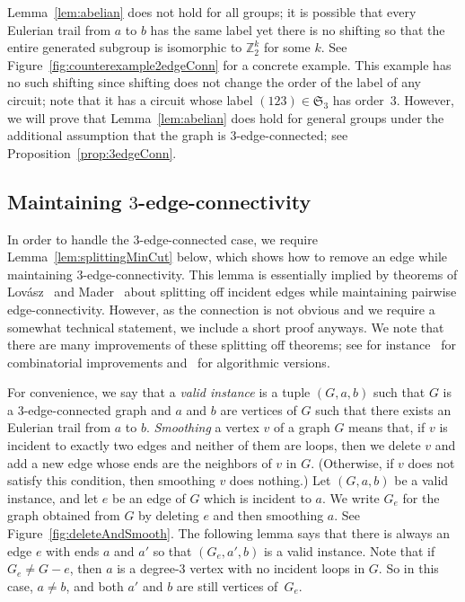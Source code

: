 \documentclass[a4paper, 12pt]{article}
\begin{document}
Lemma~\ref{lem:abelian} does {not} hold for all groups; it is possible that every Eulerian trail from $a$ to $b$ has the same label yet there is no shifting so that the entire generated subgroup is isomorphic to $\mathbb{Z}_2^k$ for some $k$. See Figure~\ref{fig:counterexample2edgeConn} for a concrete example. This example has no such shifting since shifting does not change the order of the label of any circuit; note that it has a circuit whose label $(123) \in \mathfrak{S}_3$ has order~$3$. However, we will prove that Lemma~\ref{lem:abelian} does hold for general groups under the additional assumption that the graph is $3$-edge-connected; see Proposition~\ref{prop:3edgeConn}. 

\subsection*{Maintaining $3$-edge-connectivity}
In order to handle the $3$-edge-connected case, we require Lemma~\ref{lem:splittingMinCut} below, which shows how to remove an edge while maintaining $3$-edge-connectivity. This lemma is essentially implied by theorems of Lov\'{a}sz~\cite{LovaszBook79} and Mader~\cite{MaderMaintainConn} about splitting off incident edges while maintaining pairwise edge-connectivity. However, as the connection is not obvious and we require a somewhat technical statement, we include a short proof anyways. We note that there are many improvements of these splitting off theorems; see for instance~\cite{Mader1995, localEdgeConn} for combinatorial improvements and~\cite{almostLinearSplittingOff, elementConnectivity, GabowSplitting, splitOffAlg} for algorithmic versions.

For convenience, we say that a \emph{valid instance} is a tuple $(G, a, b)$ such that $G$ is a $3$-edge-connected graph and $a$ and $b$ are vertices of $G$ such that there exists an Eulerian trail from $a$ to $b$. \emph{Smoothing} a vertex $v$ of a graph $G$ means that, if $v$ is incident to exactly two edges and neither of them are loops, then we delete $v$ and add a new edge whose ends are the neighbors of $v$ in $G$. (Otherwise, if $v$ does not satisfy this condition, then smoothing $v$ does nothing.) Let $(G, a, b)$ be a valid instance, and let $e$ be an edge of $G$ which is incident to $a$. We write $G_e$ for the graph obtained from $G$ by deleting $e$ and then smoothing $a$. See Figure~\ref{fig:deleteAndSmooth}. The following lemma says that there is always an edge $e$ with ends $a$ and $a'$ so that $(G_e, a', b)$ is a valid instance. Note that if $G_e \neq G-e$, then $a$ is a degree-$3$ vertex with no incident loops in $G$. So in this case, $a \neq b$, and both $a'$ and $b$ are still vertices of~$G_e$.
\end{document}
